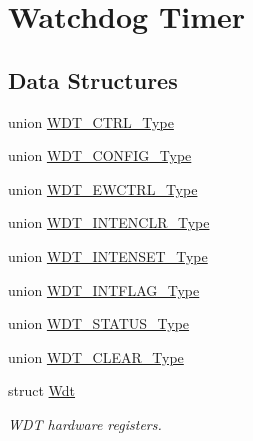 \hypertarget{group___s_a_m_d21___w_d_t}{}\section{Watchdog Timer}
\label{group___s_a_m_d21___w_d_t}
\subsection*{Data Structures}
\begin{DoxyCompactItemize}
\item 
union \mbox{\hyperlink{union_w_d_t___c_t_r_l___type}{W\+D\+T\+\_\+\+C\+T\+R\+L\+\_\+\+Type}}
\item 
union \mbox{\hyperlink{union_w_d_t___c_o_n_f_i_g___type}{W\+D\+T\+\_\+\+C\+O\+N\+F\+I\+G\+\_\+\+Type}}
\item 
union \mbox{\hyperlink{union_w_d_t___e_w_c_t_r_l___type}{W\+D\+T\+\_\+\+E\+W\+C\+T\+R\+L\+\_\+\+Type}}
\item 
union \mbox{\hyperlink{union_w_d_t___i_n_t_e_n_c_l_r___type}{W\+D\+T\+\_\+\+I\+N\+T\+E\+N\+C\+L\+R\+\_\+\+Type}}
\item 
union \mbox{\hyperlink{union_w_d_t___i_n_t_e_n_s_e_t___type}{W\+D\+T\+\_\+\+I\+N\+T\+E\+N\+S\+E\+T\+\_\+\+Type}}
\item 
union \mbox{\hyperlink{union_w_d_t___i_n_t_f_l_a_g___type}{W\+D\+T\+\_\+\+I\+N\+T\+F\+L\+A\+G\+\_\+\+Type}}
\item 
union \mbox{\hyperlink{union_w_d_t___s_t_a_t_u_s___type}{W\+D\+T\+\_\+\+S\+T\+A\+T\+U\+S\+\_\+\+Type}}
\item 
union \mbox{\hyperlink{union_w_d_t___c_l_e_a_r___type}{W\+D\+T\+\_\+\+C\+L\+E\+A\+R\+\_\+\+Type}}
\item 
struct \mbox{\hyperlink{struct_wdt}{Wdt}}
\begin{DoxyCompactList}\small\item\em W\+DT hardware registers. \end{DoxyCompactList}\end{DoxyCompactItemize}
